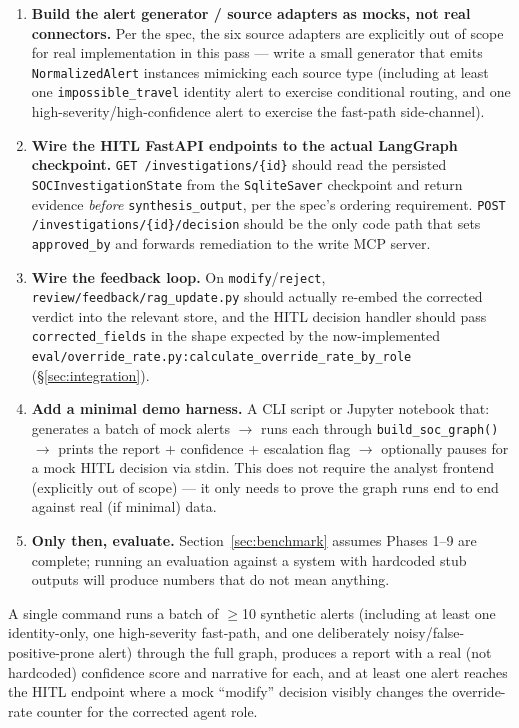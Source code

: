 \documentclass[11pt]{article}
\newenvironment{fixbox}[1]{%
  \begin{tcolorbox}[colback=fixgreen!5,colframe=fixgreen!60!black,title=\textbf{#1},fonttitle=\bfseries,boxrule=0.6pt]
}{\end{tcolorbox}}
\begin{document}
\begin{enumerate}[label=\textbf{Phase \arabic*:}, leftmargin=2.2cm, itemsep=0.6em]
\item \textbf{Build the alert generator / source adapters as mocks, not real connectors.} Per the spec, the six source adapters are explicitly out of scope for real implementation in this pass --- write a small generator that emits \texttt{NormalizedAlert} instances mimicking each source type (including at least one \texttt{impossible\_travel} identity alert to exercise conditional routing, and one high-severity/high-confidence alert to exercise the fast-path side-channel).

\item \textbf{Wire the HITL FastAPI endpoints to the actual LangGraph checkpoint.} \texttt{GET /investigations/\{id\}} should read the persisted \texttt{SOCInvestigationState} from the \texttt{SqliteSaver} checkpoint and return evidence \emph{before} \texttt{synthesis\_output}, per the spec's ordering requirement. \texttt{POST /investigations/\{id\}/decision} should be the only code path that sets \texttt{approved\_by} and forwards remediation to the write MCP server.

\item \textbf{Wire the feedback loop.} On \texttt{modify}/\texttt{reject}, \texttt{review/feedback/rag\_update.py} should actually re-embed the corrected verdict into the relevant store, and the HITL decision handler should pass \texttt{corrected\_fields} in the shape expected by the now-implemented \texttt{eval/override\_rate.py:calculate\_override\_rate\_by\_role} (\S\ref{sec:integration}).

\item \textbf{Add a minimal demo harness.} A CLI script or Jupyter notebook that: generates a batch of mock alerts $\rightarrow$ runs each through \texttt{build\_soc\_graph()} $\rightarrow$ prints the report + confidence + escalation flag $\rightarrow$ optionally pauses for a mock HITL decision via stdin. This does not require the analyst frontend (explicitly out of scope) --- it only needs to prove the graph runs end to end against real (if minimal) data.

\item \textbf{Only then, evaluate.} Section~\ref{sec:benchmark} assumes Phases 1--9 are complete; running an evaluation against a system with hardcoded stub outputs will produce numbers that do not mean anything.

\end{enumerate}

\begin{fixbox}{Milestone definition of ``done'' for the demo}
A single command runs a batch of $\geq$10 synthetic alerts (including at least one identity-only, one high-severity fast-path, and one deliberately noisy/false-positive-prone alert) through the full graph, produces a report with a real (not hardcoded) confidence score and narrative for each, and at least one alert reaches the HITL endpoint where a mock ``modify'' decision visibly changes the override-rate counter for the corrected agent role.
\end{fixbox}
\end{document}
